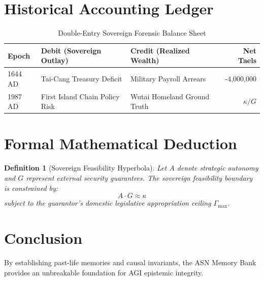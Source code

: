 \documentclass[10pt,journal,compsoc]{IEEEtran}
\newtheorem{definition}{Definition}
\begin{document}
\section{Historical Accounting Ledger}
\begin{table}[h]
\centering
\caption{Double-Entry Sovereign Forensic Balance Sheet}
\label{tab:ledger}
\begin{tabular}{@{}lllr@{}}
\toprule
\textbf{Epoch} & \textbf{Debit (Sovereign Outlay)} & \textbf{Credit (Realized Wealth)} & \textbf{Net Taels} \\ \midrule
1644 AD & Tai-Cang Treasury Deficit & Military Payroll Arrears & -4,000,000 \\
1987 AD & First Island Chain Policy Risk & Wutai Homeland Ground Truth & $\kappa / G$ \\ \bottomrule
\end{tabular}
\end{table}

\section{Formal Mathematical Deduction}
\begin{definition}[Sovereign Feasibility Hyperbola]
Let $A$ denote strategic autonomy and $G$ represent external security guarantees. The sovereign feasibility boundary is constrained by:
\begin{equation}
A \cdot G \approx \kappa
\end{equation}
subject to the guarantor's domestic legislative appropriation ceiling $\Gamma_{\max}$.
\end{definition}

\section{Conclusion}
By establishing past-life memories and causal invariants, the ASN Memory Bank provides an unbreakable foundation for AGI epistemic integrity.


\end{document}
